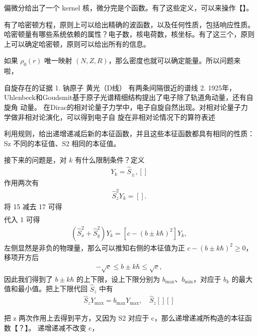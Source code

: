 偏微分给出了一个 kernel 核，微分完是个函数。有了这些定义，可以来操作【】。

有了哈密顿方程，原则上可以给出精确的波函数，以及任何性质，包括响应性质。哈密顿量有哪些系统依赖的属性？电子数，核电荷数，核坐标。有了这三个，原则上可以确定哈密顿，原则可以给出所有的信息。

如果 $\rho_0(r)$ 唯一映射 $(N, Z, R)$，那么密度也就可以确定能量。所以问题来啦，

自旋存在的证据
1. 钠原子 黄光（D线）
有两条间隔很近的谱线
2. 1925年，Uhlenbeck和Goudsmit基于原子光谱精细结构提出了电子除了轨道角动量，还有自旋角
动量。
在Dirac的相对论量子力学中，电子自旋自然出现。对相对论量子力学做非相对论演化，可以得到电子自
旋在非相对论情况下的算符表述


利用规则，给出递增递减后新的本征函数，并且这些本征函数都具有相同的性质：Sz 不同的本征值、S2 相同的本征值。

接下来的问题是，对 $k$ 有什么限制条件？定义
\begin{align}
Y_k = \hat S_{\pm}, []
\end{align}
作用两次有
\begin{align}
    \hat S_z^2 Y_k = [].
\end{align}
将 {15} 减去 {17} 可得
\begin{align}
    [][]
\end{align}
代入 {1} 可得
\begin{align}
    (\hat S_x^2 + \hat S_y^2) Y_k = [c - (b \pm k\hbar)^2] Y_k, 
\end{align}
左侧显然是非负的物理量，那么可以推知右侧的本征值为正 $c-(b\pm k\hbar)^2 \geqslant 0$，移项开方后
\begin{align}
    -\sqrt c \leqslant b \pm k\hbar \leqslant \sqrt c,
\end{align}
因此我们得到了 $b \pm k\hbar$ 的上下限，设上下限分别为 $b_{\text{max}}$、$b_{\text{min}}$，对应于 $b_k$ 的最大值和最小值。把上下限代回 $\hat S_z$ 中有
\begin{align}
    \hat S_z Y_{\text{max}} = b_{\text{max}} Y_{\text{max}}, \quad \hat S_z [][]
\end{align}

把 z 两次作用上去得到平方，又因为 S2 对应于 c，那么递增递减所构造的本征函数【？】。
递增递减不改变 c，

